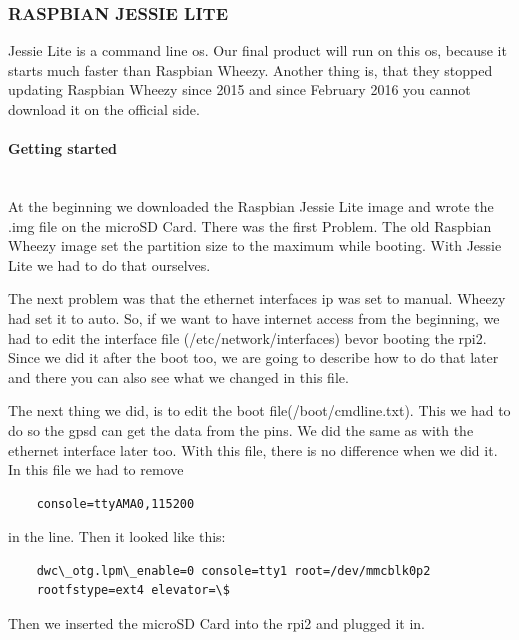 \subsubsection{RASPBIAN JESSIE LITE}
Jessie Lite is a command line \gls{os}. Our final product will run on this \gls{os}, because it starts much faster than Raspbian Wheezy. Another thing is, that they stopped updating Raspbian Wheezy since 2015 and since February 2016 you cannot download it on the official side.
\paragraph{Getting started} \mbox{}\\
At the beginning we downloaded the Raspbian Jessie Lite image and wrote the .img file on the microSD Card. There was the first Problem. The old Raspbian Wheezy image set the partition size to the maximum while booting. With Jessie Lite we had to do that ourselves. 

The next problem was that the ethernet interfaces \gls{ip} was set to manual. Wheezy had set it to auto. So, if we want to have internet access from the beginning, we had to edit the interface file (/etc/network/interfaces) bevor booting the \gls{rpi2}. Since we did it after the boot too, we are going to describe how to do that later and there you can also see what we changed in this file.

The next thing we did, is to edit the boot file(/boot/cmdline.txt). This we had to do so the \gls{gpsd} can get the data from the pins. We did the same as with the ethernet interface later too. With this file, there is no difference when we did it. 
\newline \newline
In this file we had to remove 
\begin{verbatim}
	console=ttyAMA0,115200
\end{verbatim}
in the line. \newline
Then it looked like this: 
\begin{verbatim}
	dwc\_otg.lpm\_enable=0 console=tty1 root=/dev/mmcblk0p2 
	rootfstype=ext4 elevator=\$ 
\end{verbatim}
Then we inserted the microSD Card into the \gls{rpi2} and plugged it in.

